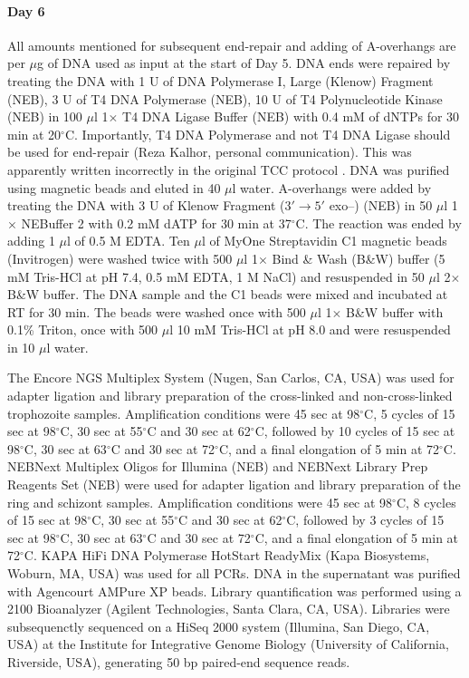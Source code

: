 \paragraph{Day 6}
All amounts mentioned for subsequent end-repair and adding of
A-overhangs are per $\mu$g of DNA used as input at the start of Day 5. DNA
ends were repaired by treating the DNA with 1 U of DNA Polymerase I,
Large (Klenow) Fragment (NEB), 3 U of T4 DNA Polymerase (NEB), 10 U of
T4 Polynucleotide Kinase (NEB) in 100 $\mu$l 1$\times$ T4 DNA Ligase Buffer (NEB)
with 0.4 mM of dNTPs for 30 min at 20$^\circ$C. Importantly, T4 DNA
Polymerase and not T4 DNA Ligase should be used for end-repair (Reza
Kalhor, personal communication). This was apparently written
incorrectly in the original TCC protocol \cite{kalhor:genome}. DNA was purified using
magnetic beads and eluted in 40 $\mu$l water. A-overhangs were added by
treating the DNA with 3 U of Klenow Fragment ($3' \rightarrow 5'$ exo--) (NEB) in 50
$\mu$l 1$\times$ NEBuffer 2 with 0.2 mM dATP for 30 min at 37$^\circ$C. The reaction was
ended by adding 1 $\mu$l of 0.5 M EDTA. Ten $\mu$l of MyOne Streptavidin C1
magnetic beads (Invitrogen) were washed twice with 500 $\mu$l 1$\times$ Bind \&
Wash (B\&W) buffer (5 mM Tris-HCl at pH 7.4, 0.5 mM EDTA, 1 M NaCl)
and resuspended in 50 $\mu$l 2$\times$ B\&W buffer. The DNA sample  and the C1
beads were mixed and incubated at RT for 30 min. The beads were washed
once with 500 $\mu$l 1$\times$ B\&W buffer with 0.1\% Triton, once with 500 $\mu$l 10
mM Tris-HCl at pH 8.0 and were resuspended in 10 $\mu$l water.

The Encore NGS Multiplex System (Nugen, San Carlos, CA, USA) was used
for adapter ligation and library preparation of the cross-linked and
non-cross-linked trophozoite samples. Amplification conditions were 45
sec at 98$^\circ$C, 5 cycles of 15 sec at 98$^\circ$C, 30 sec at 55$^\circ$C and 30 sec at
62$^\circ$C, followed by 10 cycles of 15 sec at 98$^\circ$C, 30 sec at 63$^\circ$C and 30
sec at 72$^\circ$C, and a final elongation of 5 min at 72$^\circ$C. NEBNext
Multiplex Oligos for Illumina (NEB) and NEBNext Library Prep Reagents
Set (NEB) were used for adapter ligation and library preparation of
the ring and schizont samples. Amplification conditions were 45 sec at
98$^\circ$C, 8 cycles of 15 sec at 98$^\circ$C, 30 sec at 55$^\circ$C and 30 sec at 62$^\circ$C,
followed by 3 cycles of 15 sec at 98$^\circ$C, 30 sec at 63$^\circ$C and 30 sec at
72$^\circ$C, and a final elongation of 5 min at 72$^\circ$C. KAPA HiFi DNA
Polymerase HotStart ReadyMix (Kapa Biosystems, Woburn, MA, USA) was
used for all PCRs. DNA in the supernatant was purified with Agencourt
AMPure XP beads. Library quantification was performed using a 2100
Bioanalyzer (Agilent Technologies, Santa Clara, CA, USA). Libraries
were subsequenctly sequenced on a HiSeq 2000 system (Illumina, San
Diego, CA, USA) at the Institute for Integrative Genome Biology
(University of California, Riverside, USA), generating 50 bp
paired-end sequence reads.


